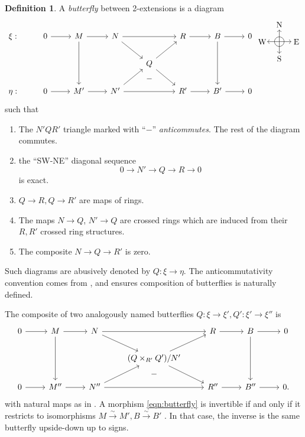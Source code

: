 \documentclass[11pt,reqno]{amsart}
\theoremstyle{definition}
\newtheorem{definition}[theorem]{Definition}
\newcommand{\longsimeq}{\overset{\sim}{\longrightarrow}}
\begin{document}
\begin{definition}

A \emph{butterfly} \cite{nlab:butterfly} between 2-extensions is a diagram
\begin{equation}\label{eqn:butterfly}
\begin{tikzcd}
\xi : &0 \ar[r]   &M \ar[r] \ar[dd]   &N\ar[dr] \ar[rr]  &&R \ar[r]     &B \ar[dd] \ar[r]  &0  \\
&    & & &Q \ar[ur] \ar[dr] \ar[d, phantom, "-"]  & & \\
\eta : &0 \ar[r]   &M'  \ar[r] &N'\ar[ur]  \ar[rr] &\phantom{a} &R' \ar[r]    &B' \ar[r] &0
\end{tikzcd}    
\begin{tikzpicture}[scale=.75]
\draw[->] (0, 0) to (0, .7);
\draw[->] (0, 0) to (.7, 0);
\draw[->] (0, 0) to (0, -.7);
\draw[->] (0, 0) to (-.7, 0);
\draw (0, 0) circle (.8em);
\node at (0, 1){N};
\node at (1, 0){E};
\node at (-1, 0){W};
\node at (0, -1){S};
\end{tikzpicture}
\end{equation}
such that 
\begin{enumerate}
    \item The $N'QR'$ triangle marked with ``$-$'' \emph{anticommutes}. The rest of the diagram commutes.
    \item\label{eitem:SWNEexact} the ``SW-NE'' diagonal sequence 
    \[0 \to N' \to Q \to R \to 0\]
    is exact. 
    \item $Q \to R, Q \to R'$ are maps of rings. 
    \item\label{eitem:crossmodcptibility} The maps $N \to Q$, $N' \to Q$ are crossed rings which are induced from their $R, R'$ crossed ring structures. 
    \item The composite $N \to Q \to R'$ is zero.
\end{enumerate}
\end{definition}


Such diagrams are abusively denoted by $Q : \xi \to \eta$. The anticommutativity convention comes from \cite[Equation (1)]{wisebutterflies}, and ensures composition of butterflies is naturally defined. 


The composite of two analogously named butterflies $Q : \xi \to \xi', Q' : \xi' \to \xi''$ is
\[\begin{tikzcd}
0 \ar[r]  &M \ar[r] \ar[dd]  &N \ar[rr] \ar[dr]  &&R \ar[r]  &B \ar[r] \ar[dd]  &0 \\
 & & &(Q \times_{R'} Q')/N' \ar[ur] \ar[dr]\\
0  \ar[r] &M'' \ar[r]  &N'' \ar[rr] \ar[ur]  &\phantom{a} \ar[from=u, phantom, "-"]  &R'' \ar[r] &B'' \ar[r] &0.
\end{tikzcd}\]
with natural maps as in \cite[\S 3]{wisebutterflies}. A morphism \eqref{eqn:butterfly} is invertible if and only if it restricts to isomorphisms $M \longsimeq M', B \longsimeq B'$ \cite[Proposition 3]{wisebutterflies}. In that case, the inverse is the same butterfly upside-down up to signs. 
\end{document}
